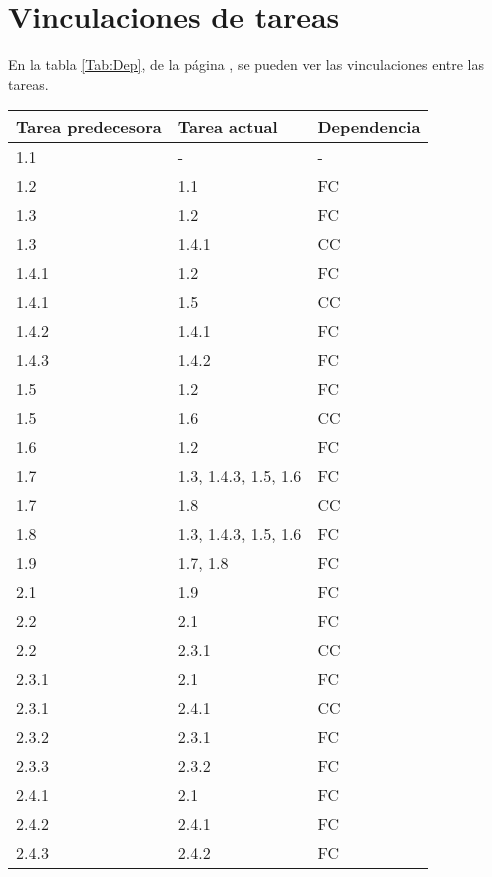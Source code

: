 \documentclass[11pt,a4paper,spanish,twoside]{book}
\begin{document}
\section{Vinculaciones de tareas}
En la tabla \ref{Tab:Dep}, de la página \pageref{Tab:Dep}, se pueden ver las
vinculaciones entre las tareas.
\begin{table}[!h]
  \centering
  \small
  \begin{tabular}{|l|p{5cm}|l|}
    \hline
    \textbf{Tarea predecesora} & \textbf{Tarea actual} & \textbf{Dependencia}\\
    \hline \hline
    1.1   & -                    & -  \\
    1.2   & 1.1                  & FC \\
    1.3   & 1.2                  & FC \\
    1.3   & 1.4.1                & CC \\
    1.4.1 & 1.2                  & FC \\
    1.4.1 & 1.5                  & CC \\
    1.4.2 & 1.4.1                & FC \\
    1.4.3 & 1.4.2                & FC \\
    1.5   & 1.2                  & FC \\
    1.5   & 1.6                  & CC \\
    1.6   & 1.2                  & FC \\
    1.7   & 1.3, 1.4.3, 1.5, 1.6 & FC \\
    1.7   & 1.8                  & CC \\
    1.8   & 1.3, 1.4.3, 1.5, 1.6 & FC \\
    1.9   & 1.7, 1.8             & FC \\
    \hline
    2.1   & 1.9                  & FC \\
    2.2   & 2.1                  & FC \\
    2.2   & 2.3.1                & CC \\
    2.3.1 & 2.1                  & FC \\
    2.3.1 & 2.4.1                & CC \\
    2.3.2 & 2.3.1                & FC \\
    2.3.3 & 2.3.2                & FC \\
    2.4.1 & 2.1                  & FC \\
    2.4.2 & 2.4.1                & FC \\
    2.4.3 & 2.4.2                & FC \\

\end{tabular}
\end{table}
\end{document}
